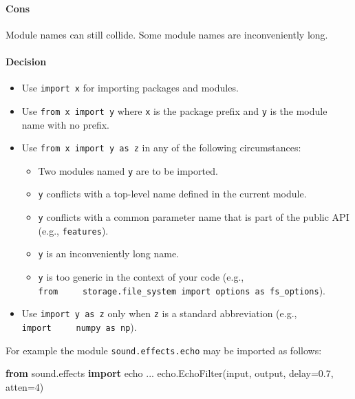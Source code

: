 \documentclass[
]{article}
\newenvironment{Shaded}{}{}
\newcommand{\BuiltInTok}[1]{\textcolor[rgb]{0.00,0.50,0.00}{#1}}
\newcommand{\DecValTok}[1]{\textcolor[rgb]{0.25,0.63,0.44}{#1}}
\newcommand{\FloatTok}[1]{\textcolor[rgb]{0.25,0.63,0.44}{#1}}
\newcommand{\ImportTok}[1]{\textcolor[rgb]{0.00,0.50,0.00}{\textbf{#1}}}
\newcommand{\NormalTok}[1]{#1}
\newcommand{\OperatorTok}[1]{\textcolor[rgb]{0.40,0.40,0.40}{#1}}
\providecommand{\tightlist}{%
  \setlength{\itemsep}{0pt}\setlength{\parskip}{0pt}}
\begin{document}
\paragraph{Cons}

Module names can still collide. Some module names are inconveniently
long.

\paragraph{Decision}

\begin{itemize}
\tightlist
\item
  Use \texttt{import\ x} for importing packages and modules.
\item
  Use \texttt{from\ x\ import\ y} where \texttt{x} is the package prefix
  and \texttt{y} is the module name with no prefix.
\item
  Use \texttt{from\ x\ import\ y\ as\ z} in any of the following
  circumstances:

  \begin{itemize}
  \tightlist
  \item
    Two modules named \texttt{y} are to be imported.
  \item
    \texttt{y} conflicts with a top-level name defined in the current
    module.
  \item
    \texttt{y} conflicts with a common parameter name that is part of
    the public API (e.g., \texttt{features}).
  \item
    \texttt{y} is an inconveniently long name.
  \item
    \texttt{y} is too generic in the context of your code (e.g.,
    \texttt{from\ \ \ \ \ storage.file\_system\ import\ options\ as\ fs\_options}).
  \end{itemize}
\item
  Use \texttt{import\ y\ as\ z} only when \texttt{z} is a standard
  abbreviation (e.g., \texttt{import\ \ \ \ \ numpy\ as\ np}).
\end{itemize}

For example the module \texttt{sound.effects.echo} may be imported as
follows:

\begin{samepage}
\begin{Shaded}
\begin{Highlighting}[]
\ImportTok{from}\NormalTok{ sound.effects }\ImportTok{import}\NormalTok{ echo}
\NormalTok{...}
\NormalTok{echo.EchoFilter(}\BuiltInTok{input}\NormalTok{, output, delay}\OperatorTok{=}\FloatTok{0.7}\NormalTok{, atten}\OperatorTok{=}\DecValTok{4}\NormalTok{)}
\end{Highlighting}
\end{Shaded}
\end{samepage}
\end{document}
